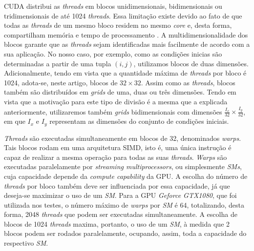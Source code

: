 \documentclass[12pt]{article}
\begin{document}
CUDA distribui as \textit{threads} em blocos unidimensionais, bidimensionais ou
tridimensionais de até 1024 \textit{threads}. Essa limitação existe devido ao
fato de que todas as \textit{threads} de um mesmo bloco residem no mesmo
\textit{core} e, desta forma, compartilham memória e tempo de processamento
\cite{cuda}. A multidimensionalidade dos blocos garante que as \textit{threads}
sejam identificadas mais facilmente de acordo com a sua aplicação. No nosso
caso, por exemplo, como as condições inicias são determinadas a partir de uma
tupla \((i,j)\), utilizamos blocos de duas dimensões. Adicionalmente, tendo em
vista que a quantidade máxima de \textit{threads} por bloco é 1024, adota-se,
neste artigo, blocos de \(32\times32\). Assim como as \textit{threads}, blocos
também são distribuídos em \textit{grids} de uma, duas ou três dimensões. Tendo
em vista que a motivação para este tipo de divisão é a mesma que a explicada
anteriormente, utilizaremos também \textit{grids} bidimensionais com dimensões
\(\frac{I_x}{32}\times\frac{I_y}{32}\), em que \(I_x\) e \(I_y\) representam as
dimensões do conjunto de condições iniciais.

\textit{Threads} são executadas simultaneamente em blocos de 32, denominados
\textit{warps}. Tais blocos rodam em uma arquitetura SIMD, isto é, uma única
instrução é capaz de realizar a mesma operação para todas as suas
\textit{threads}. \textit{Warps} são executadas paralelamente por
\textit{streaming multiprocessors}, ou simplesmente \textit{SMs}, cuja
capacidade depende da \textit{compute capability} da GPU. A escolha do número de
\textit{threads} por bloco também deve ser influenciada por essa capacidade, já
que deseja-se maximizar o uso de um \textit{SM}. Para a GPU \textit{Geforce
GTX1080}, que foi utilizada nos testes, o número máximo de \textit{warps} por
\textit{SM} é 64, totalizando, desta forma, 2048 \textit{threads} que podem ser
executadas simultaneamente. A escolha de blocos de 1024
\textit{threads} maxima, portanto, o uso de um \textit{SM}, à medida que 2
blocos podem ser rodados paralelamente, ocupando, assim, toda a capacidade do
respectivo \textit{SM}.
\end{document}
